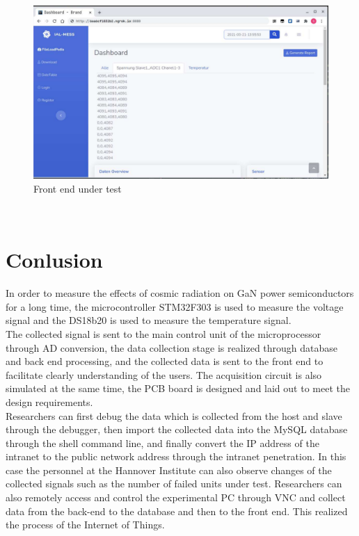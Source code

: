 \begin{figure}[!ht]
	\centering
	\includegraphics[width=16cm]{grafiken/frontend.pdf}
	\caption{Front end under test}
	\label{fig:7.6}
\end{figure}
\FloatBarrier
\\



 

\chapter{Conlusion}
\label{chap:Conlusion}
In order to measure the effects of cosmic radiation on GaN power semiconductors for a long time, the microcontroller STM32F303 is used to measure the voltage signal and the DS18b20 is used to measure the temperature signal.
\\
The collected signal is sent to the main control unit of the microprocessor through AD conversion, the data collection stage is realized through database and back end processing, and the collected data is sent to the front end to facilitate clearly understanding of the users.
The acquisition circuit is also simulated at the same time, the PCB board is designed and laid out to meet the design requirements.
\\
Researchers can first debug the data which is collected from the host and slave through the debugger, then import the collected data into the MySQL database through the shell command line, and finally convert the IP address of the intranet to the public network address through the intranet penetration. In this case the personnel at the Hannover Institute can also observe changes of the collected signals such as the number of failed units under test. Researchers can also remotely access and control the experimental PC through VNC and collect data from the back-end to the database and then to the front end. This realized the process of the Internet of Things.



